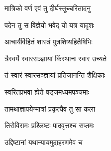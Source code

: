 {मात्रिको वर्ण एवं तु दीर्घस्तूच्चरितादनु}

{पदेन तु स विज्ञेयो भवेद् यो यत्र यादृशः}

{आचार्यैर्विहितं शास्त्रं पुत्रशिष्यहितैषिभिः}

{त्रैस्वर्ये स्वारसञ्ज्ञायां किंस्थानः स्वार उच्यते}

{तं स्वारं स्वारसञ्ज्ञायां प्रतिजानन्ति शैक्षिकाः}

{स्वरितप्रभवा ह्येते षड्जमध्यमपञ्चमाः}

{तामथाज्ञापयेन्मात्रां प्रकृत्यैव तु सा कला}

{तिरोविरामः प्रश्लिष्टः पादवृत्तश्च सप्तमः}

{उद्दिष्टानां यथान्यायमुदाहरणमेव च}

\closesub
\closesection
